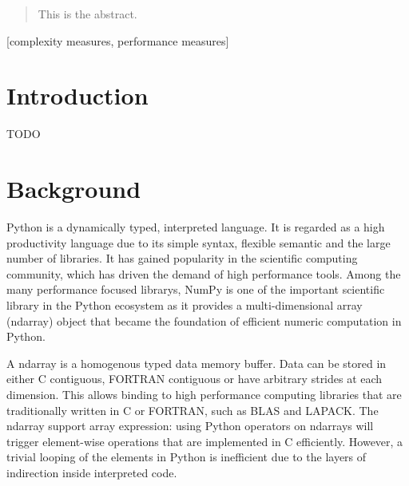 \documentclass{acm_proc_article-sp}
\begin{document}
\date{30 July 1999}

\maketitle
\begin{abstract}
This is the abstract.
\end{abstract}

[complexity measures, performance measures]



\section{Introduction}
TODO

\section{Background}

Python is a dynamically typed, interpreted language.
It is regarded as a high productivity language due to its simple syntax,
flexible semantic and the large number of libraries.
It has gained popularity in the scientific computing community,
which has driven the demand of high performance tools.
Among the many performance focused librarys, NumPy is one of the important
scientific library in the Python ecosystem as it provides a multi-dimensional
array (ndarray) object that became the foundation of efficient numeric
computation in Python.

A ndarray is a homogenous typed data memory buffer.
Data can be stored in either C contiguous, FORTRAN contiguous or have arbitrary
strides at each dimension.  This allows binding to high performance computing
libraries that are traditionally written in C or FORTRAN, such as BLAS and
LAPACK. The ndarray support array expression: using Python operators on
ndarrays will trigger element-wise operations that are implemented in C
efficiently.  However, a trivial looping of the elements in Python is
inefficient due to the layers of indirection inside interpreted code.
\end{document}
